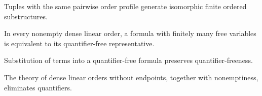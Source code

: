 \begin{lemma}
\label{lem:dlo-profile-fgequiv}
\leanok
Tuples with the same pairwise order profile generate isomorphic finite ordered substructures.
\end{lemma}

\begin{lemma}
\label{lem:dlo-qf-finite-correct}
\leanok
{}
In every nonempty dense linear order, a formula with finitely many free variables is equivalent to its quantifier-free representative.
\end{lemma}

\begin{lemma}
\label{lem:dlo-qf-subst}
\leanok
Substitution of terms into a quantifier-free formula preserves quantifier-freeness.
\end{lemma}

\begin{theorem}
\label{thm:dlo-qe}
\leanok
{}
The theory of dense linear orders without endpoints, together with nonemptiness, eliminates quantifiers.
\end{theorem}
